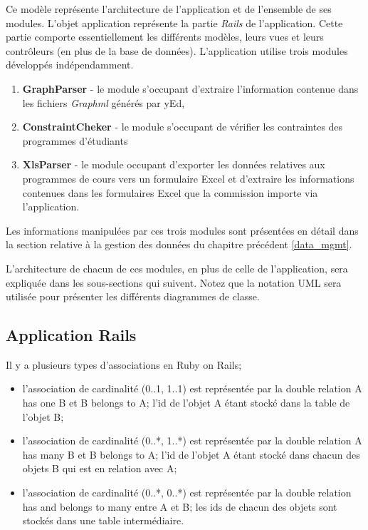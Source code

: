 Ce modèle représente l'architecture de l'application et de l'ensemble de ses modules. L'objet application représente la partie \textit{Rails} de l'application. Cette partie comporte essentiellement les différents modèles, leurs vues et leurs contrôleurs (en plus de la base de données). L'application utilise trois modules développés indépendamment.
\begin{enumerate}
  \item \textbf{GraphParser} - le module s'occupant d'extraire l'information contenue dans les fichiers \textit{Graphml} générés par yEd, 
  \item \textbf{ConstraintCheker} - le module s'occupant de vérifier les contraintes des programmes d'étudiants
  \item \textbf{XlsParser} - le module occupant d'exporter les données relatives aux programmes de cours vers un formulaire Excel et d'extraire les informations contenues dans les formulaires Excel que la commission importe via l'application. 
\end{enumerate}

Les informations manipulées par ces trois modules sont présentées en détail dans la section relative à la gestion des données du chapitre précédent \ref{data_mgmt}.

L'architecture de chacun de ces modules, en plus de celle de l'application, sera expliquée dans les sous-sections qui suivent. Notez que la notation UML sera utilisée pour présenter les différents diagrammes de classe. 


\clearpage
\subsection{Application Rails}
\label{rails_arch}

Il y a plusieurs types d'associations en Ruby on Rails;
\begin{itemize}
  \item l'association de cardinalité  (0..1, 1..1) est représentée par la double relation A has one B et B belongs to A; l'id de l'objet A étant stocké dans la table de l'objet B;
  \item l'association de cardinalité (0..*, 1..*) est représentée par la double relation A has many B et B belongs to A; l'id de l'objet A étant stocké dans chacun des objets B qui est en relation avec A;
  \item l'association de cardinalité (0..*, 0..*) est représentée par la double relation has and belongs to many entre A et B; les ids de chacun des objets sont stockés dans une table intermédiaire. 
\end{itemize}

